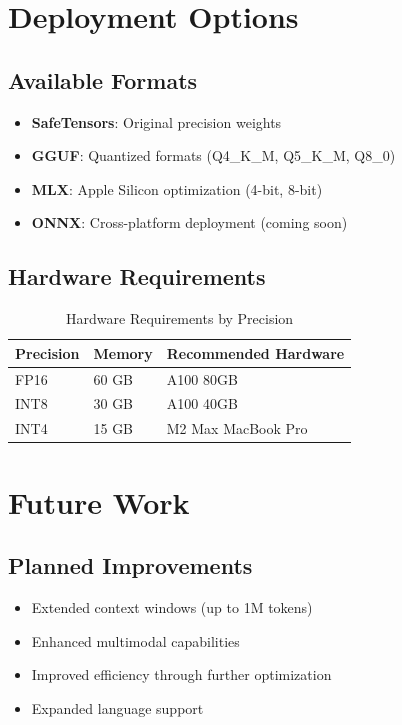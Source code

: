 \documentclass[11pt,a4paper]{article}
\begin{document}
\section{Deployment Options}

\subsection{Available Formats}
\begin{itemize}
    \item \textbf{SafeTensors}: Original precision weights
    \item \textbf{GGUF}: Quantized formats (Q4\_K\_M, Q5\_K\_M, Q8\_0)
    \item \textbf{MLX}: Apple Silicon optimization (4-bit, 8-bit)
    \item \textbf{ONNX}: Cross-platform deployment (coming soon)
\end{itemize}

\subsection{Hardware Requirements}
\begin{table}[H]
\centering
\begin{tabular}{lll}
\toprule
\textbf{Precision} & \textbf{Memory} & \textbf{Recommended Hardware} \\
\midrule
FP16 & 60 GB & A100 80GB \\
INT8 & 30 GB & A100 40GB \\
INT4 & 15 GB & M2 Max MacBook Pro \\
\bottomrule
\end{tabular}
\caption{Hardware Requirements by Precision}
\end{table}

\section{Future Work}

\subsection{Planned Improvements}
\begin{itemize}
    \item Extended context windows (up to 1M tokens)
    \item Enhanced multimodal capabilities
    \item Improved efficiency through further optimization
    \item Expanded language support
\end{itemize}
\end{document}

